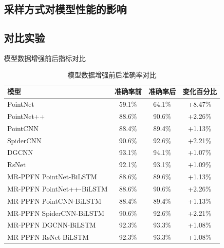 \subsection{采样方式对模型性能的影响}


\subsection{对比实验}

\begin{table}[htbp]
    \caption{模型数据增强前后指标对比}
    \label{tab:metric-comparison}
    \centering

    \begin{subtable}{\linewidth}
        \centering
        \caption{模型数据增强前后准确率对比}
        \begin{tabular}{lccc}
            \toprule
            \textbf{模型} & \textbf{准确率前} & \textbf{准确率后} & \textbf{变化百分比} \\
            \midrule
            PointNet & 59.1\% & 64.1\% & +8.47\% \\
            PointNet++ & 88.6\% & 90.6\% & +2.26\% \\
            PointCNN & 88.4\% & 89.4\% & +1.13\% \\
            SpiderCNN & 90.6\% & 92.6\% & +2.21\% \\
            DGCNN & 93.1\% & 94.1\% & +1.07\% \\
            RsNet & 92.1\% & 93.1\% & +1.09\% \\
            MR-PPFN PointNet-BiLSTM & 88.6\% & 89.6\% & +1.13\% \\
            MR-PPFN PointNet++-BiLSTM & 88.6\% & 90.6\% & +2.26\% \\
            MR-PPFN PointCNN-BiLSTM & 88.4\% & 89.4\% & +1.13\% \\
            MR-PPFN SpiderCNN-BiLSTM & 90.6\% & 92.6\% & +2.21\% \\
            MR-PPFN DGCNN-BiLSTM & 92.3\% & 93.3\% & +1.08\% \\
            MR-PPFN RsNet-BiLSTM & 92.3\% & 93.3\% & +1.08\% \\
            \bottomrule
        \end{tabular}
        \label{tab:accuracy-comparison}
    \end{subtable}

    \vspace{0.4cm}


\end{table}
